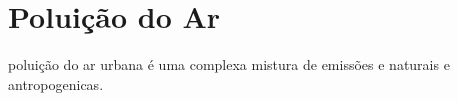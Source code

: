\section{Poluição do Ar}
poluição do ar urbana é uma complexa mistura de emissões e naturais e antropogenicas.  
